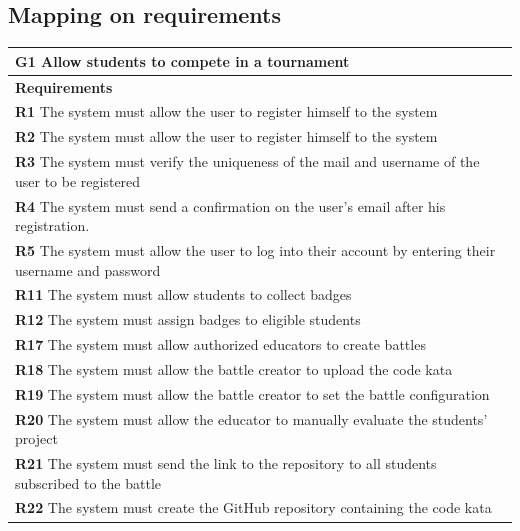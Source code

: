 \subsection{Mapping on requirements}
\begin{table}[H]
    \begin{tabularx}{\textwidth}{X}
        \toprule
        \textbf{G1} Allow students to compete in a tournament                                                       \\ \midrule
        \textbf{Requirements}                                                                                                        \\ \midrule
        \textbf{R1} The system must allow the user to register himself to the system                                                    \\
        \textbf{R2} The system must allow the user to register himself to the system                                         \\ 
        \textbf{R3} The system must verify the uniqueness of the mail and username of the user to be registered                                        \\ 
        \textbf{R4} The system must send a confirmation on the user's email after his registration.                         \\ 
        \textbf{R5} The system must allow the user to log into their account by entering their username and password           \\ 
        \textbf{R11} The system must allow students to collect badges        \\ 
        \textbf{R12} The system must assign badges to eligible students          \\
        \textbf{R17} The system must allow authorized educators to create battles        \\ 
        \textbf{R18} The system must allow the battle creator to upload the code kata       \\ 
        \textbf{R19} The system must allow the battle creator to set the battle configuration                \\ 
        \textbf{R20} The system must allow the educator to manually evaluate the students' project          \\    
        \textbf{R21} The system must send the link to the repository to all students subscribed to the battle            \\ 
        \textbf{R22} The system must create the GitHub repository containing the code kata               \\ 

\end{tabularx}
\end{table}
